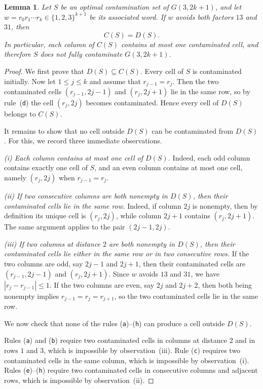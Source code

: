 \documentclass[letterpaper,12pt]{article}
\newtheorem{lemma}{Lemma}
\begin{document}
\begin{lemma}\label{lem:3row-avoid}
Let \(S\) be an optimal contamination set of \(G(3,2k+1)\), and let
\(w=r_0r_1\cdots r_k\in\{1,2,3\}^{k+1}\) be its associated word. If \(w\)
avoids both factors \(13\) and \(31\), then
\[
C(S)=D(S).
\]
In particular, each column of \(C(S)\) contains at most one contaminated cell,
and therefore \(S\) does not fully contaminate \(G(3,2k+1)\).
\end{lemma}

\begin{proof}
We first prove that \(D(S)\subseteq C(S)\). Every cell of \(S\) is contaminated
initially. Now let \(1\le j\le k\) and assume that \(r_{j-1}=r_j\). Then the
two contaminated cells $(r_{j-1},2j-1)$ and $(r_j,2j+1)$ lie in the same row, so by rule~\textup{(\texttt{d})} the cell \((r_j,2j)\) becomes
contaminated. Hence every cell of \(D(S)\) belongs to \(C(S)\).

It remains to show that no cell outside \(D(S)\) can be contaminated from
\(D(S)\). For this, we record three immediate observations.

 
\noindent\textit{(i) Each column contains at most one cell of \(D(S)\).}
Indeed, each odd column contains exactly one cell of \(S\), and an even column
contains at most one cell, namely \((r_j,2j)\) when \(r_{j-1}=r_j\).

 
\noindent\textit{(ii) If two consecutive columns are both nonempty in \(D(S)\),
then their contaminated cells lie in the same row.}
Indeed, if column \(2j\) is nonempty, then by definition its unique cell is
\((r_j,2j)\), while column \(2j+1\) contains \((r_j,2j+1)\). The same argument
applies to the pair \((2j-1,2j)\).

 
\noindent\textit{(iii) If two columns at distance \(2\) are both nonempty in
\(D(S)\), then their contaminated cells lie either in the same row or in two
consecutive rows.}
If the two columns are odd, say \(2j-1\) and \(2j+1\), then their contaminated
cells are \((r_{j-1},2j-1)\) and \((r_j,2j+1)\). Since \(w\) avoids \(13\) and
\(31\), we have \(|r_j-r_{j-1}|\le 1\). If the two columns are even, say
\(2j\) and \(2j+2\), then both being nonempty implies $r_{j-1}=r_j=r_{j+1}$,  so the two contaminated cells lie in the same row.

 
We now check that none of the rules \textup{(\texttt{a})}--\textup{(\texttt{h})} can produce a
cell outside \(D(S)\).

Rules \textup{(\texttt{a})} and \textup{(\texttt{b})} require two contaminated cells in columns
at distance \(2\) and in rows \(1\) and \(3\), which is impossible by
observation~(iii). Rule \textup{(\texttt{c})} requires two contaminated cells in the
same column, which is impossible by observation~(i). Rules
\textup{(\texttt{e})}--\textup{(\texttt{h})} require two contaminated cells in consecutive
columns and adjacent rows, which is impossible by observation~(ii).


\end{proof}
\end{document}
